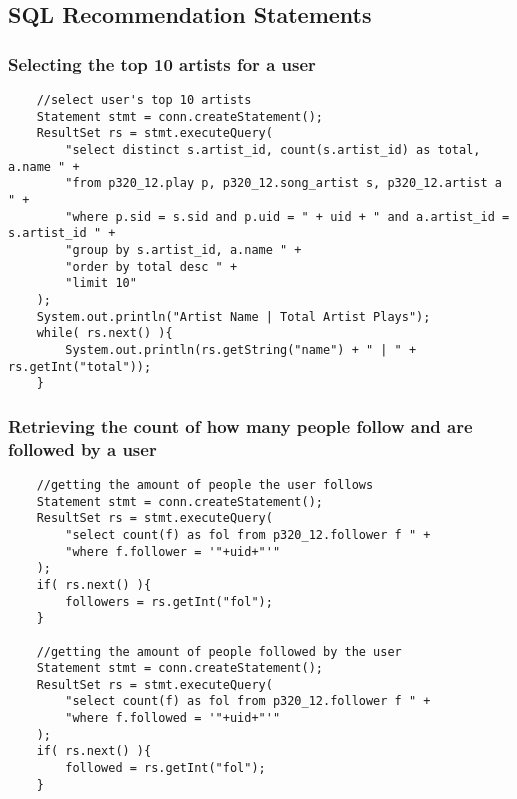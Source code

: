 \documentclass[12pt]{article}
\begin{document}
    
    \subsection{SQL Recommendation Statements}
    
    \subsubsection{Selecting the top 10 artists for a user}
    \begin{lstlisting}
    //select user's top 10 artists
    Statement stmt = conn.createStatement();
    ResultSet rs = stmt.executeQuery(
        "select distinct s.artist_id, count(s.artist_id) as total, a.name " +
        "from p320_12.play p, p320_12.song_artist s, p320_12.artist a " +
        "where p.sid = s.sid and p.uid = " + uid + " and a.artist_id = s.artist_id " +
        "group by s.artist_id, a.name " +
        "order by total desc " +
        "limit 10"
    );
    System.out.println("Artist Name | Total Artist Plays");
    while( rs.next() ){
        System.out.println(rs.getString("name") + " | " + rs.getInt("total"));
    }
    \end{lstlisting}

    \subsubsection{Retrieving the count of how many people follow and are followed by a user}

    \begin{lstlisting}
    //getting the amount of people the user follows
    Statement stmt = conn.createStatement();
    ResultSet rs = stmt.executeQuery(
        "select count(f) as fol from p320_12.follower f " +
        "where f.follower = '"+uid+"'"
    );
    if( rs.next() ){
        followers = rs.getInt("fol");
    }

    //getting the amount of people followed by the user
    Statement stmt = conn.createStatement();
    ResultSet rs = stmt.executeQuery(
        "select count(f) as fol from p320_12.follower f " +
        "where f.followed = '"+uid+"'"
    );
    if( rs.next() ){
        followed = rs.getInt("fol");
    }
    \end{lstlisting}
\end{document}

